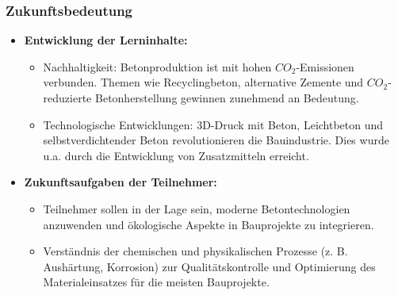 \documentclass[
11pt,
captions=tableheading,
smallheadings,
headsepline,
footsepline, 
captions=tableheading,
parskip=half-,
]{scrartcl}
\begin{document}
\subsubsection{Zukunftsbedeutung}
\begin{itemize}
    \item \textbf{Entwicklung der Lerninhalte:}
          \begin{itemize}
              \item Nachhaltigkeit: Betonproduktion ist mit hohen $CO_2$-Emissionen verbunden. Themen wie Recyclingbeton, alternative Zemente und $CO_2$-reduzierte Betonherstellung gewinnen zunehmend an Bedeutung.
              \item Technologische Entwicklungen: 3D-Druck mit Beton, Leichtbeton und selbstverdichtender Beton revolutionieren die Bauindustrie. Dies wurde u.a. durch die Entwicklung von Zusatzmitteln erreicht.
          \end{itemize}
    \item \textbf{Zukunftsaufgaben der Teilnehmer:}
          \begin{itemize}
              \item Teilnehmer sollen in der Lage sein, moderne Betontechnologien anzuwenden und ökologische Aspekte in Bauprojekte zu integrieren.
              \item Verständnis der chemischen und physikalischen Prozesse (z. B. Aushärtung, Korrosion) zur Qualitätskontrolle und Optimierung des Materialeinsatzes für die meisten Bauprojekte.
          \end{itemize}
\end{itemize}
\end{document}
